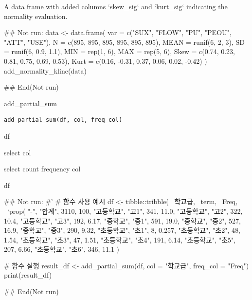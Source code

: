 \documentclass[a4paper]{book}
\begin{document}
%
\begin{Value}
A data frame with added columns `skew\_sig` and `kurt\_sig` indicating the normality evaluation.
\end{Value}
%
\begin{Examples}
\begin{ExampleCode}
\#\# Not run: 
data <- data.frame(
  var = c("SUX", "FLOW", "PU", "PEOU", "ATT", "USE"),
  N = c(895, 895, 895, 895, 895, 895),
  MEAN = runif(6, 2, 3),
  SD = runif(6, 0.9, 1.1),
  MIN = rep(1, 6),
  MAX = rep(5, 6),
  Skew = c(0.74, 0.23, 0.81, 0.75, 0.69, 0.53),
  Kurt = c(0.16, -0.31, 0.37, 0.06, 0.02, -0.42)
)
add_normality_kline(data)

## End(Not run)
\end{ExampleCode}
\end{Examples}
%
\begin{Description}
add\_partial\_sum
\end{Description}
%
\begin{Usage}
\begin{verbatim}
add_partial_sum(df, col, freq_col)
\end{verbatim}
\end{Usage}
%
\begin{Arguments}
\begin{ldescription}
\item[\code{df}] df

\item[\code{col}] select col

\item[\code{freq\_col}] select count frequency col
\end{ldescription}
\end{Arguments}
%
\begin{Value}
df
\end{Value}
%
\begin{Examples}
\begin{ExampleCode}
\#\# Not run: 
#'
# 함수 사용 예시
df <- tibble::tribble(
  ~학교급, ~term, ~Freq, ~`prop(%
  "-", "합계", 3110, 100,
  "고등학교", "고1", 341, 11.0,
  "고등학교", "고2", 322, 10.4,
  "고등학교", "고3", 192, 6.17,
  "중학교", "중1", 591, 19.0,
  "중학교", "중2", 527, 16.9,
  "중학교", "중3", 290, 9.32,
  "초등학교", "초1", 8, 0.257,
  "초등학교", "초2", 48, 1.54,
  "초등학교", "초3", 47, 1.51,
  "초등학교", "초4", 191, 6.14,
  "초등학교", "초5", 207, 6.66,
  "초등학교", "초6", 346, 11.1
)

# 함수 실행
result_df <- add_partial_sum(df, col = "학교급", freq_col = "Freq")
print(result_df)

## End(Not run)

\end{ExampleCode}
\end{Examples}
\end{document}
